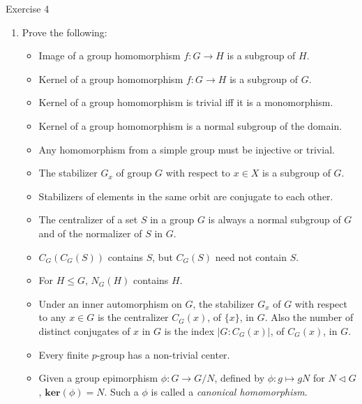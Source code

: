 \documentclass{beamer}
\newcommand\italictext[1]{\textcolor{italics}{\textit{#1}}}
\newcounter{savedenum}
\newcommand*{\saveenum}{\setcounter{savedenum}{\theenumi}}
\begin{document}
\begin{frame}{Exercise 4}
    \begin{enumerate}
        \item Prove the following:
        \begin{itemize}
            \item Image of a group homomorphism $f:G\xrightarrow{}H$ is a subgroup of $H$.
            \item Kernel of a group homomorphism $f:G\xrightarrow{}H$ is a subgroup of $G$.
            \item Kernel of a group homomorphism is trivial iff it is a monomorphism.
            \item Kernel of a group homomorphism is a normal subgroup of the domain.
            \item Any homomorphism from a simple group must be injective or trivial.
            \item The stabilizer $G_x$ of group $G$ with respect to $x\in X$ is a subgroup of $G$.
            \item Stabilizers of elements in the same orbit are conjugate to each other.
            \item The centralizer of a set $S$ in a group $G$ is always a normal subgroup of $G$ and of the normalizer of $S$ in $G$.
            \item $C_G(C_G(S))$ contains $S$, but $C_G(S)$ need not contain $S$.
            \item For $H\leq G$, $N_G(H)$ contains $H$.
            \item\label{ex_class_eq} Under an inner automorphism on $G$, the stabilizer $G_x$ of $G$ with respect to any $x\in G$ is the centralizer $C_G(x)$, of $\{x\}$, in $G$. Also the number of distinct conjugates of $x$ in $G$ is the index $\lvert G:C_G(x)\rvert$, of $C_G(x)$, in $G$.
            \item Every finite $p$-group has a non-trivial center.
            \item Given a group epimorphism $\phi:G\xrightarrow{}G/N$, defined by $\phi:g\mapsto gN$ for $N\vartriangleleft G$, $\mathbf{ker}(\phi)=N$. Such a $\phi$ is called a \italictext{canonical homomorphism}.
        \end{itemize}
        \saveenum
    \end{enumerate}
\end{frame}
\end{document}
